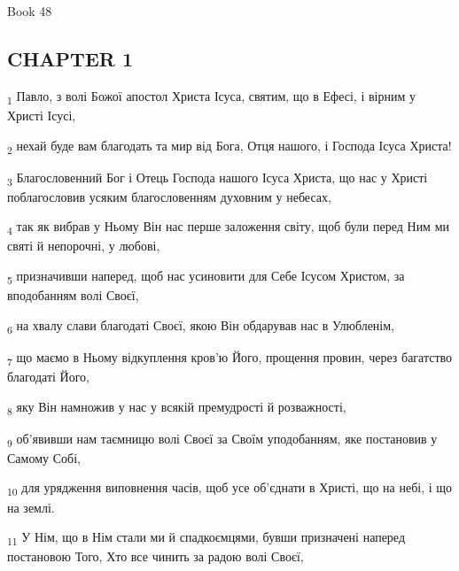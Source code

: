 Book 48
\subsection{CHAPTER 1}
\begin{tcolorbox}
\textsubscript{1} Павло, з волі Божої апостол Христа Ісуса, святим, що в Ефесі, і вірним у Христі Ісусі,
\end{tcolorbox}
\begin{tcolorbox}
\textsubscript{2} нехай буде вам благодать та мир від Бога, Отця нашого, і Господа Ісуса Христа!
\end{tcolorbox}
\begin{tcolorbox}
\textsubscript{3} Благословенний Бог і Отець Господа нашого Ісуса Христа, що нас у Христі поблагословив усяким благословенням духовним у небесах,
\end{tcolorbox}
\begin{tcolorbox}
\textsubscript{4} так як вибрав у Ньому Він нас перше заложення світу, щоб були перед Ним ми святі й непорочні, у любові,
\end{tcolorbox}
\begin{tcolorbox}
\textsubscript{5} призначивши наперед, щоб нас усиновити для Себе Ісусом Христом, за вподобанням волі Своєї,
\end{tcolorbox}
\begin{tcolorbox}
\textsubscript{6} на хвалу слави благодаті Своєї, якою Він обдарував нас в Улюбленім,
\end{tcolorbox}
\begin{tcolorbox}
\textsubscript{7} що маємо в Ньому відкуплення кров'ю Його, прощення провин, через багатство благодаті Його,
\end{tcolorbox}
\begin{tcolorbox}
\textsubscript{8} яку Він намножив у нас у всякій премудрості й розважності,
\end{tcolorbox}
\begin{tcolorbox}
\textsubscript{9} об'явивши нам таємницю волі Своєї за Своїм уподобанням, яке постановив у Самому Собі,
\end{tcolorbox}
\begin{tcolorbox}
\textsubscript{10} для урядження виповнення часів, щоб усе об'єднати в Христі, що на небі, і що на землі.
\end{tcolorbox}
\begin{tcolorbox}
\textsubscript{11} У Нім, що в Нім стали ми й спадкоємцями, бувши призначені наперед постановою Того, Хто все чинить за радою волі Своєї,
\end{tcolorbox}
